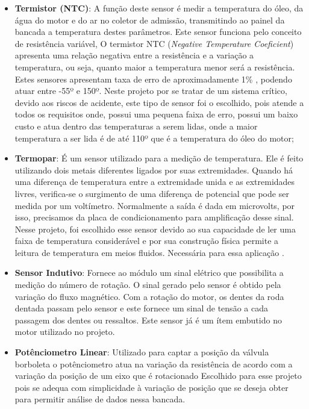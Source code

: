 \begin{itemize}
	\item \textbf{Termistor (NTC)}:
	A função deste sensor é medir a temperatura do óleo, da água do motor e do ar no coletor de admissão, transmitindo ao painel da bancada a temperatura destes parâmetros. Este sensor funciona pelo conceito de resistência variável, O termistor NTC (\textit{Negative Temperature Coeficient}) apresenta uma relação negativa entre a resistência e a variação a temperatura, ou seja, quanto maior a temperatura menor será a resistência. Estes sensores apresentam taxa de erro de aproximadamente 1\% , podendo atuar entre -55º e 150º. Neste projeto por se tratar de um sistema crítico, devido aos riscos de acidente, este tipo de sensor foi o escolhido, pois atende a todos os requisitos onde, possui uma pequena faixa de erro, possui um baixo custo e atua dentro das temperaturas a serem lidas, onde a maior temperatura a ser lida é de até 110º que é a temperatura do óleo do motor\cite{vdo01};
	
	\item \textbf{Termopar}: É um sensor utilizado para a medição de temperatura. Ele é feito utilizando dois metais diferentes ligados por suas extremidades. Quando há uma diferença de temperatura entre a extremidade unida e as extremidades livres, verifica-se o surgimento de uma diferença de potencial que pode ser medida por um voltímetro. Normalmente a saída é dada em microvolts, por isso, precisamos da placa de condicionamento para amplificação desse sinal. Nesse projeto, foi escolhido esse sensor devido ao sua capacidade de ler uma faixa de temperatura considerável e por sua construção física permite a leitura de temperatura em meios fluidos. Necessária para essa aplicação \cite{vdo01}.
	
	\item \textbf{Sensor Indutivo}: Fornece ao módulo um sinal elétrico que possibilita a medição do número de rotação. O sinal gerado pelo sensor é obtido pela variação do fluxo magnético. Com a rotação do motor, os dentes da roda dentada passam pelo sensor e este fornece um sinal de tensão a cada passagem dos dentes ou ressaltos. Este sensor já é um ítem embutido no motor utilizado no projeto\cite{vdo01}.
	
	\item \textbf{Potênciometro Linear}:
	Utilizado para captar a posição da válvula borboleta o potênciometro atua na variação da resistência de acordo com a variação da posição de um eixo que é rotacionado Escolhido para esse projeto pois se adequa com simplicidade à variação de posição que se deseja obter para permitir análise de dados nessa bancada\cite{vdo01}.
	

\end{itemize}
